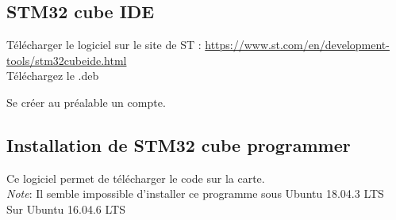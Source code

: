 \documentclass{article}
\begin{document}
\subsection{STM32 cube IDE }
Télécharger le logiciel sur le site de ST : \url{https://www.st.com/en/development-tools/stm32cubeide.html}\\
Téléchargez le .deb

Se créer au préalable un compte.


\subsection{Installation de STM32 cube programmer}
Ce logiciel permet de télécharger le code sur la carte. \\
\textit{Note}: Il semble impossible d'installer ce programme sous Ubuntu 18.04.3 LTS \\
Sur Ubuntu 16.04.6 LTS
\end{document}
